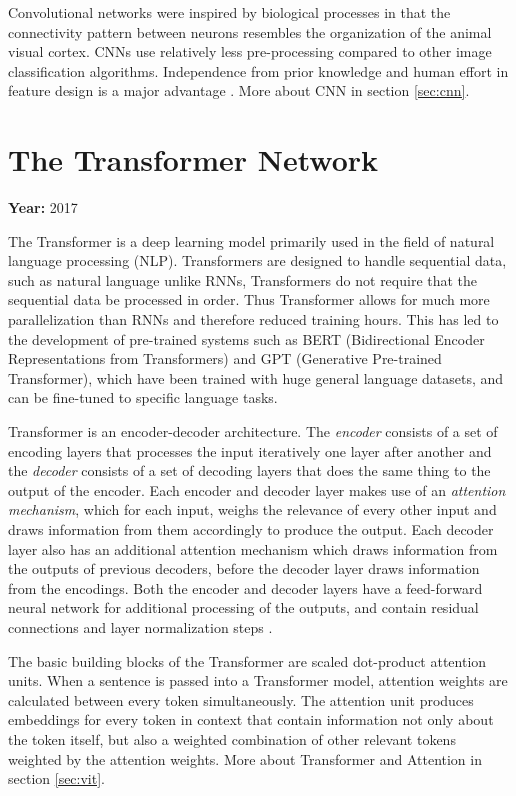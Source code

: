 \documentclass[12pt, a4paper]{report}
\begin{document}
Convolutional networks were inspired by biological processes in that the connectivity pattern between neurons resembles the organization of the animal visual cortex. CNNs use relatively less pre-processing compared to other image classification algorithms. Independence from prior knowledge and human effort in feature design is a major advantage \cite{wiki:cnns}. More about CNN in section \eqref{sec:cnn}.

\section{The Transformer Network}
\label{sec:ttn}

\textbf{Year:} 2017

The Transformer is a deep learning model primarily used in the field of natural language processing (NLP). Transformers are designed to handle sequential data, such as natural language unlike RNNs, Transformers do not require that the sequential data be processed in order. Thus Transformer allows for much more parallelization than RNNs and therefore reduced training hours. This has led to the development of pre-trained systems such as BERT (Bidirectional Encoder Representations from Transformers) and GPT (Generative Pre-trained Transformer), which have been trained with huge general language datasets, and can be fine-tuned to specific language tasks.

Transformer is an encoder-decoder architecture. The \emph{encoder} consists of a set of encoding layers that processes the input iteratively one layer after another and the \emph{decoder} consists of a set of decoding layers that does the same thing to the output of the encoder. Each encoder and decoder layer makes use of an \emph{attention mechanism}, which for each input, weighs the relevance of every other input and draws information from them accordingly to produce the output. Each decoder layer also has an additional attention mechanism which draws information from the outputs of previous decoders, before the decoder layer draws information from the encodings. Both the encoder and decoder layers have a feed-forward neural network for additional processing of the outputs, and contain residual connections and layer normalization steps \cite{wiki:transformer}.

The basic building blocks of the Transformer are scaled dot-product attention units. When a sentence is passed into a Transformer model, attention weights are calculated between every token simultaneously. The attention unit produces embeddings for every token in context that contain information not only about the token itself, but also a weighted combination of other relevant tokens weighted by the attention weights. More about Transformer and Attention in section \eqref{sec:vit}.
\vspace*{\fill}
\end{document}
